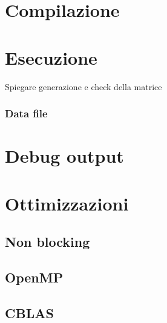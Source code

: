 \section{Compilazione}

\section{Esecuzione}
Spiegare generazione e check della matrice

\subsubsection{Data file}

\section{Debug output}

\section{Ottimizzazioni}

\subsection{Non blocking}

\subsection{OpenMP}

\subsection{CBLAS}
